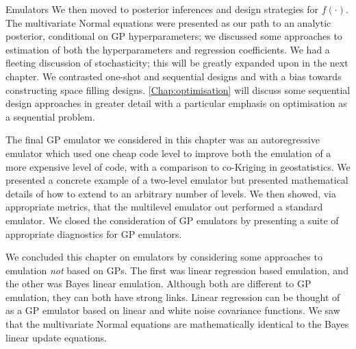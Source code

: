 \begin{chapter}{Emulators \label{Ch:Emulators}}
We then moved to posterior inferences and design strategies for $f(\cdot)$. The multivariate Normal equations were presented as our path to an analytic posterior, conditional on GP hyperparameters; we discussed some approaches to estimation of both the hyperparameters and regression coefficients. We had a fleeting discussion of stochasticity; this will be greatly expanded upon in the next chapter. We contrasted one-shot and sequential designs and with a bias towards constructing space filling designs. \cref{Chap:optimisation} will discuss some sequential design approaches in greater detail with a particular emphasis on optimisation as a sequential problem.

The final GP emulator we considered in this chapter was an autoregressive emulator which used one cheap code level to improve both the emulation of a more expensive level of code, with a comparison to co-Kriging in geostatistics. We presented a concrete example of a two-level emulator but presented mathematical details of how to extend to an arbitrary number of levels. We then showed, via appropriate metrics, that the multilevel emulator out performed a standard emulator. We closed the consideration of GP emulators by presenting a suite of appropriate diagnostics for GP emulators.

We concluded this chapter on emulators by considering some approaches to emulation \textit{not} based on GPs. The first was linear regression based emulation, and the other was Bayes linear emulation. Although both are different to GP emulation, they can both have strong links. Linear regression can be thought of as a GP emulator based on linear and white noise covariance functions. We saw that the multivariate Normal equations are mathematically identical to the Bayes linear update equations.
\end{chapter}
